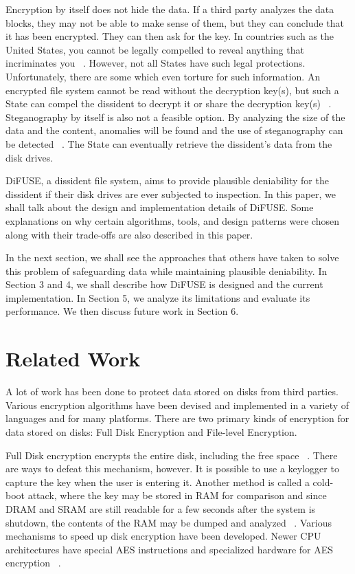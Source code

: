 \documentclass[10pt,twocolumn]{article}
\begin{document}
Encryption by itself does not hide the data. If a third party analyzes the data blocks, they may not be able to make sense of them, but they can conclude that it has been encrypted. They can then ask for the key. In countries such as the United States, you cannot be legally compelled to reveal anything that incriminates you ~\cite{fifth}. However, not all States have such legal protections. Unfortunately, there are some which even torture for such information. An encrypted file system cannot be read without the decryption key(s), but such a State can compel the dissident to decrypt it or share the decryption key(s) ~\cite{gametheory,stegfs}. Steganography by itself is also not a feasible option. By analyzing the size of the data and the content, anomalies will be found and the use of steganography can be detected ~\cite{steg}. The State can eventually retrieve the dissident’s data from the disk drives. 

DiFUSE, a dissident file system, aims to provide plausible deniability for the dissident if their disk drives are ever subjected to inspection. In this paper, we shall talk about the design and implementation details of DiFUSE. Some explanations on why certain algorithms, tools, and design patterns were chosen along with their trade-offs are also described in this paper. 

In the next section, we shall see the approaches that others have taken to solve this problem of safeguarding data while maintaining plausible deniability. In Section 3 and 4, we shall describe how DiFUSE is designed and the current implementation. In Section 5, we analyze its limitations and evaluate its performance. We then discuss future work in Section 6. 

\section{Related Work}

A lot of work has been done to protect data stored on disks from third parties. Various encryption algorithms have been devised and implemented in a variety of languages and for many platforms. There are two primary kinds of encryption for data stored on disks: Full Disk Encryption and File-level Encryption. 

Full Disk encryption encrypts the entire disk, including the free space ~\cite{disksym,diskintel,diskwin}. There are ways to defeat this mechanism, however. It is possible to use a keylogger to capture the key when the user is entering it. Another method is called a cold-boot attack, where the key may be stored in RAM for comparison and since DRAM and SRAM are still readable for a few seconds after the system is shutdown, the contents of the RAM may be dumped and analyzed ~\cite{androidenc}. Various mechanisms to speed up disk encryption have been developed. Newer CPU architectures have special AES instructions and specialized hardware for AES encryption ~\cite{intelaes}. 
\end{document}
